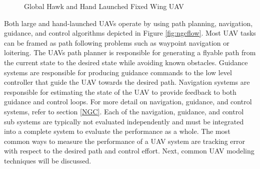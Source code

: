 \documentclass[numbered,pdftex]{ohio-etd}
\begin{document}
\begin{figure}[H]
	\begin{subfigmatrix}{2}%
		\centering
		\hspace*{0mm}
	\end{subfigmatrix}
	\caption{Global Hawk and Hand Launched Fixed Wing UAV}
	\label{fig:fixedwings}
\end{figure}





Both large and hand-launched UAVs operate by using path planning, navigation, guidance, and control algorithms depicted in Figure \ref{fig:ngcflow}. Most UAV tasks can be framed as path following problems such as waypoint navigation or loitering. The UAVs path planner is responsible for generating a flyable path from the current state to the desired state while avoiding known obstacles. Guidance systems are responsible for producing guidance commands to the low level controller that guide the UAV towards the desired path. Navigation systems are responsible for estimating the state of the UAV to provide feedback to both guidance and control loops. For more detail on navigation, guidance, and control systems, refer to section \ref{NGC}. Each of the navigation, guidance, and control sub systems are typically not evaluated independently and must be integrated into a complete system to evaluate the performance as a whole. The most common ways to measure the performance of a UAV system are tracking error with respect to the desired path and control effort. Next, common UAV modeling techniques will be discussed.
\end{document}
